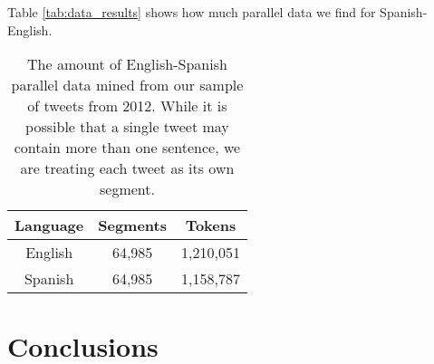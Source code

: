 Table \ref{tab:data_results} shows how much parallel data we find
for Spanish-English.

\begin{table*}[ht]
\begin{center}
\begin{tabular}{|c||c|c|}
\hline
Language & Segments & Tokens \\
\hline
\hline
English & 64,985 & 1,210,051 \\
\hline
Spanish & 64,985 & 1,158,787 \\
\hline
\end{tabular}
\end{center}
\caption{The amount of English-Spanish parallel data mined from our sample of
tweets from 2012. While it is possible that a single tweet may contain more than
one sentence, we are treating each tweet as its own segment.}
\label{tab:tweet_data_results}
\end{table*}

\section{Conclusions}
